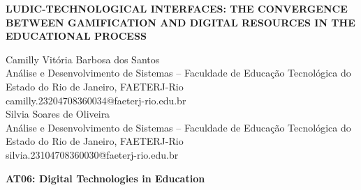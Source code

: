 \documentclass[12pt,a4paper]{article}
\begin{document}
\begin{center}
    {\fontsize{14pt}{16pt}\selectfont \textbf{LUDIC-TECHNOLOGICAL INTERFACES: 
    THE CONVERGENCE BETWEEN GAMIFICATION AND DIGITAL RESOURCES IN THE EDUCATIONAL PROCESS}}
\end{center}

\vspace{2em}


\noindent
\hfill
\begin{minipage}[t]{0.90\textwidth}
\raggedleft
Camilly Vitória Barbosa dos Santos \\
Análise e Desenvolvimento de Sistemas – Faculdade de Educação Tecnológica do Estado do Rio de Janeiro, FAETERJ-Rio \\
camilly.23204708360034@faeterj-rio.edu.br \\[1em]

Silvia Soares de Oliveira \\
Análise e Desenvolvimento de Sistemas – Faculdade de Educação Tecnológica do Estado do Rio de Janeiro, FAETERJ-Rio \\
silvia.23104708360030@faeterj-rio.edu.br
\end{minipage}

\vspace{2em}

\noindent
\begin{minipage}[t]{0.48\textwidth}
\raggedright
\textbf{AT06: Digital Technologies in Education}
\end{minipage}

\vspace{1em}
\end{document}
